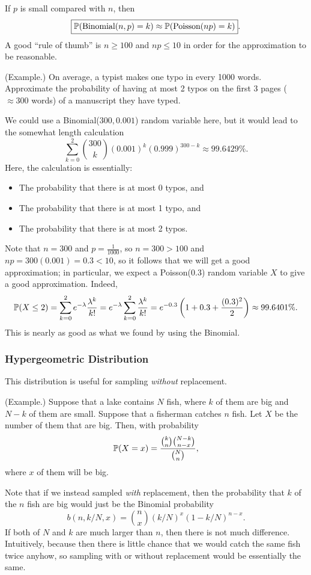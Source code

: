 \documentclass[letterpaper]{article}
\begin{document}
\bigskip 

If $p$ is small compared with $n$, then 
\[\boxed{\mathbb{P}(\text{Binomial}(n, p) = k) \approx \mathbb{P}(\text{Poisson}(np) = k)}.\]
A good ``rule of thumb'' is $n \geq 100$ and $np \leq 10$ in order for the approximation to be reasonable. 

\begin{mdframed}[]
    (Example.) On average, a typist makes one typo in every 1000 words. Approximate the probability of having at most 2 typos on the first 3 pages ($\approx 300$ words) of a manuscript they have typed. 

    \begin{mdframed}[]
        We could use a Binomial($300, 0.001$) random variable here, but it would lead to the somewhat length calculation 
        \[\sum_{k = 0}^2 \binom{300}{k} (0.001)^k (0.999)^{300 - k} \approx 99.6429\%.\]
        Here, the calculation is essentially: 
        \begin{itemize}
            \item The probability that there is at most 0 typos, and
            \item The probability that there is at most 1 typo, and
            \item The probability that there is at most 2 typos. 
        \end{itemize}
        Note that $n = 300$ and $p = \frac{1}{1000}$, so $n = 300 > 100$ and $np = 300(0.001) = 0.3 < 10$, so it follows that we will get a good approximation; in particular, we expect a Poisson($0.3$) random variable $X$ to give a good approximation. Indeed, 
        \[\mathbb{P}(X \leq 2) = \sum_{k = 0}^2 e^{-\lambda} \frac{\lambda^k}{k!} = e^{-\lambda} \sum_{k = 0}^2 \frac{\lambda^k}{k!} = e^{-0.3}\left(1 + 0.3 + \frac{(0.3)^2}{2}\right) \approx 99.6401\%.\]
        This is nearly as good as what we found by using the Binomial. 
    \end{mdframed}
\end{mdframed}

\subsubsection{Hypergeometric Distribution}
This distribution is useful for sampling \emph{without} replacement. 

\begin{mdframed}[]
    (Example.) Suppose that a lake contains $N$ fish, where $k$ of them are big and $N - k$ of them are small. Suppose that a fisherman catches $n$ fish. Let $X$ be the number of them that are big. Then, with probability 
    \[\mathbb{P}(X = x) = \frac{\binom{k}{n} \binom{N - k}{n - x}}{\binom{N}{n}},\]
    where $x$ of them will be big. 
\end{mdframed}
Note that if we instead sampled \emph{with} replacement, then the probability that $k$ of the $n$ fish are big would just be the Binomial probability 
\[b(n, k / N, x) = \binom{n}{x} (k/N)^x (1 - k/N)^{n - x}.\]
If both of $N$ and $k$ are much larger than $n$, then there is not much difference. Intuitively, because then there is little chance that we would catch the same fish twice anyhow, so sampling with or without replacement would be essentially the same. 
\end{document}
